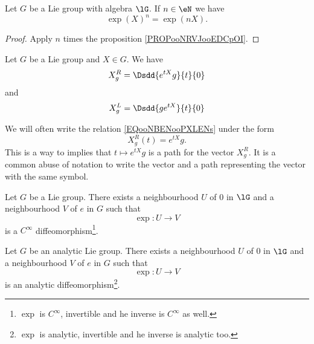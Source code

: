 \begin{lemma}       \label{LEMooRPHVooAtZJnz}
    Let \( G\) be a Lie group with algebra \( \lG\). If \( n\in \eN\) we have
    \begin{equation}
        \exp(X)^n=\exp(nX).
    \end{equation}
\end{lemma}

\begin{proof}
    Apply \( n\) times the proposition \ref{PROPooNRVJooEDCpOI}.
\end{proof}

\begin{lemma}       \label{LEMooLMTZooCvunSl}
    Let \( G\) be a Lie group and \( X\in G\). We have
    \begin{equation}        \label{EQooNBENooPXLENs}
        X^R_g=\Dsdd{  e^{tX}g }{t}{0}
    \end{equation}
    and
    \begin{equation}
        X^L_g=\Dsdd{  ge^{tX} }{t}{0}
    \end{equation}
\end{lemma}

\begin{normaltext}      \label{NORMooSATDooIhwXXr}
    We will often write the relation \eqref{EQooNBENooPXLENs} under the form
    \begin{equation}
        X^R_g(t)= e^{tX}g.
    \end{equation}
    This is a way to implies that \( t\mapsto  e^{tX}g\) is a path for the vector \( X^R_g\). It is a common abuse of notation to write the vector and a path representing the vector with the same symbol.
\end{normaltext}

\begin{proposition}     \label{PROPooYFZZooLUOuOj}
    Let \( G\) be a Lie group. There exists a neighbourhood \( U\) of \( 0\) in \( \lG\) and a neighbourhood \( V\) of \( e\) in \( G\) such that
    \begin{equation}
        \exp\colon U\to V
    \end{equation}
    is a \(  C^{\infty}\) diffeomorphism\footnote{\( \exp\) is \(  C^{\infty}\), invertible and he inverse is \(  C^{\infty}\) as well.}.
\end{proposition}

\begin{proposition}     \label{PROPooAICDooQcmPZB}
    Let \( G\) be an analytic Lie group. There exists a neighbourhood \( U\) of \( 0\) in \( \lG\) and a neighbourhood \( V\) of \( e\) in \( G\) such that
    \begin{equation}
        \exp\colon U\to V
    \end{equation}
    is an analytic diffeomorphism\footnote{\( \exp\) is analytic, invertible and he inverse is analytic too.}.
\end{proposition}

